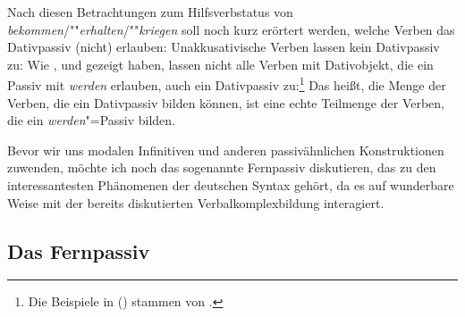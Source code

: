 Nach diesen Betrachtungen zum Hilfsverbstatus von \emph{bekommen}/""\emph{erhalten}/""\emph{kriegen}
soll noch kurz erörtert werden, welche Verben das Dativpassiv (nicht) erlauben:
Unakkusativische Verben lassen kein Dativpassiv zu:
\eal
\label{bsp-kriegen-erg}
\zl
Wie \citet*[]{Reis76a}, \citet*[]{Askedal84} und 
\citet{Leirbukt87} gezeigt haben, lassen nicht alle Verben mit Dativobjekt,
die ein Passiv mit \emph{werden} erlauben, auch ein Dativpassiv zu:\footnote{
        Die Beispiele in () stammen von \citet*[]{Askedal84}.%
}
\eal
{}
\zl
Das heißt, die Menge der Verben, die ein Dativpassiv bilden können,
ist eine echte Teilmenge der Verben, die ein \emph{werden}"=Passiv bilden.

Bevor wir uns modalen Infinitiven und anderen passivähnlichen Konstruktionen
zuwenden, möchte ich noch das sogenannte Fernpassiv diskutieren,
das zu den interessantesten Phänomenen der deutschen Syntax gehört,
da es auf wunderbare Weise mit der bereits diskutierten Verbalkomplexbildung
interagiert.
\largerpage

\subsection{Das Fernpassiv}
\label{sec-remote-passive-phen}

